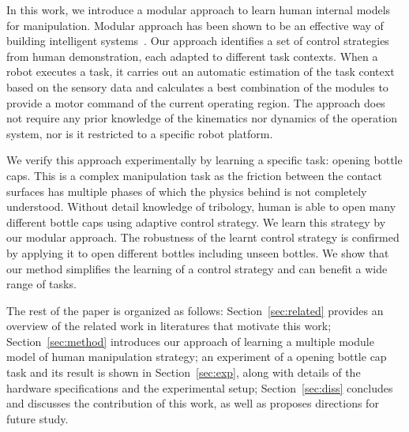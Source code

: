 In this work, we introduce a modular approach to learn human internal models for manipulation. Modular approach has been shown to be an effective way of building intelligent systems~\cite{bryson2004modular,BrysonMcG12}. Our approach identifies a set of control strategies from human demonstration, each adapted to different task contexts. When a robot executes a task, it carries out an automatic estimation of the task context based on the sensory data and calculates a best combination of the modules to provide a motor command of the current operating region. The approach does not require any prior knowledge of the kinematics nor dynamics of the operation system, nor is it restricted to a specific robot platform. %

We verify this approach experimentally by learning a specific task: opening bottle caps. This is a complex manipulation task as the friction between the contact surfaces has multiple phases of which the physics behind is not completely understood. Without detail knowledge of tribology, human is able to open many different bottle caps using adaptive control strategy. We learn this strategy by our modular approach. The robustness of the learnt control strategy is confirmed by applying it to open different bottles including unseen bottles. We show that our method simplifies the learning of a control strategy and can benefit a wide range of tasks.


The rest of the paper is organized as follows: Section~\ref{sec:related} provides an overview of the related work in literatures that motivate this work; Section~\ref{sec:method} introduces our approach of learning a multiple module model of human manipulation strategy; an experiment of a opening bottle cap task and its result is shown in Section~\ref{sec:exp}, along with details of the hardware specifications and the experimental setup; Section~\ref{sec:diss} concludes and discusses the contribution of this work, as well as proposes directions for future study. 